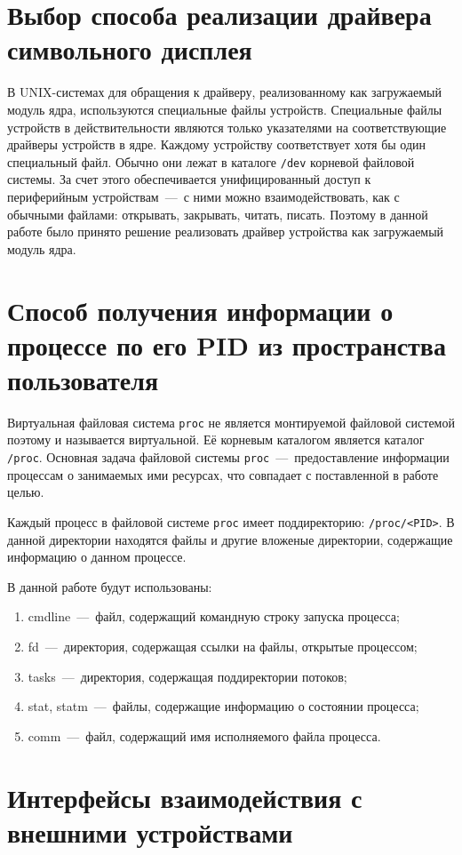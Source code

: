 \section{Выбор способа реализации драйвера символьного дисплея}
В UNIX-системах для обращения к драйверу, реализованному как загружаемый модуль ядра, используются специальные файлы устройств. Специальные файлы устройств в действительности являются только указателями на соответствующие драйверы устройств в ядре. Каждому устройству соответствует хотя бы один специальный файл. Обычно они лежат в каталоге \texttt{/dev} корневой файловой системы. За счет этого обеспечивается унифицированный доступ к периферийным устройствам~---~с ними можно взаимодействовать, как с обычными файлами: открывать, закрывать, читать, писать. Поэтому в данной работе было принято решение реализовать драйвер устройства как загружаемый модуль ядра. 

\section{Способ получения информации о процессе по его PID из пространства пользователя}
Виртуальная файловая система \texttt{proc} не является монтируемой файловой системой поэтому и называется виртуальной. Её корневым каталогом является каталог \texttt{/proc}. Основная задача файловой системы \texttt{proc}~---~предоставление информации процессам о занимаемых ими ресурсах, что совпадает с поставленной в работе целью.

Каждый процесс в файловой системе \texttt{proc} имеет поддиректорию: \texttt{/proc/<PID>}. В данной директории находятся файлы и другие вложеные директории, содержащие информацию о данном процессе. 

В данной работе будут использованы:
\begin{enumerate}
	\item cmdline~---~файл, содержащий командную строку запуска процесса;
	\item fd~---~директория, содержащая ссылки на файлы, открытые процессом;
	\item tasks~---~директория, содержащая поддиректории потоков;
	\item stat, statm~---~файлы, содержащие информацию о состоянии процесса;
	\item comm~---~файл, содержащий имя исполняемого файла процесса.
\end{enumerate}

\section{Интерфейсы взаимодействия с внешними устройствами}

